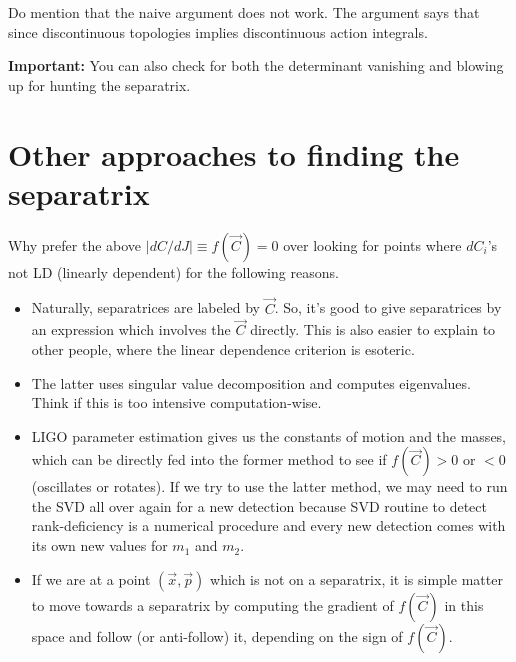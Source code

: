 \documentclass[prd,floatfix,nofootinbib,longbibliography,notitlepage,superscriptaddress]{revtex4-1}
\begin{document}
Do mention that the naive argument does not work. The argument says that
since discontinuous topologies implies discontinuous action integrals.



\textbf{Important:} You can also check for both the determinant vanishing
and blowing up for hunting the separatrix.



\section{Other approaches to finding the separatrix}


Why prefer the above $|dC/dJ| \equiv f(\vec{C}) = 0$ over looking for points where
$dC_i$'s not LD (linearly dependent) for the following reasons.
\begin{itemize}
\item Naturally, separatrices are labeled by $\vec{C}$. So, it's 
good to give separatrices by an expression which involves 
the $\vec{C}$ directly. This is also easier to explain to 
other people, where the linear dependence criterion is esoteric.
\item The latter uses singular value decomposition and
computes eigenvalues. Think if this is too intensive computation-wise.
\item LIGO parameter estimation gives us the constants of motion and the 
masses, which can be directly fed into the former method to see
if $f(\vec{C}) >0$ or $<0$ (oscillates or rotates). If we try to use the latter 
method, we may need to run the SVD all over again for a new detection
because SVD routine to detect rank-deficiency is a numerical procedure
and every new detection comes with its own new values for $m_1$ and $m_2$. 
\item If we are at a point $(\vec{x}, \vec{p})$ which is not on
a separatrix, it is simple matter to move towards a separatrix by 
computing the gradient of $f(\vec{C})$ in this space 
and follow (or anti-follow) it, depending on the sign of $f(\vec{C})$.
\end{itemize}







\end{document}
